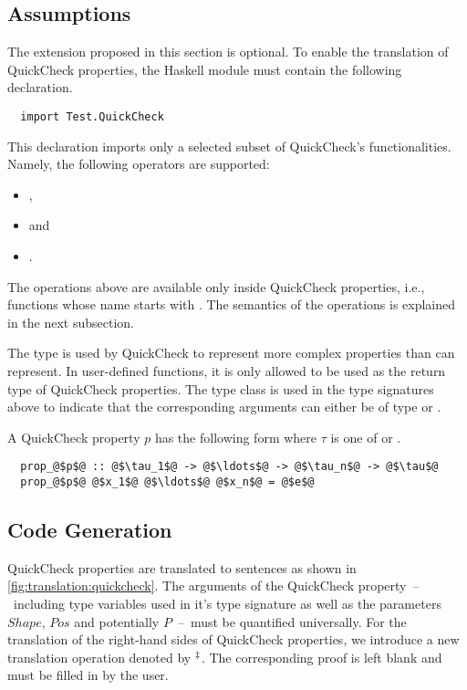 \subsection{Assumptions} \label{sec:translation:quickcheck:assumptions}
The extension proposed in this section is optional.
To enable the translation of QuickCheck properties, the Haskell module must contain the following  declaration.
\begin{verbatim}
  import Test.QuickCheck
\end{verbatim}
This  declaration imports only a selected subset of QuickCheck's functionalities.
Namely, the following operators are supported:
\begin{itemize}
  \item {},
  \item {} and
  \item {}.
\end{itemize}
The operations above are available only inside QuickCheck properties, i.e., functions whose name starts with .
The semantics of the operations is explained in the next subsection.

The type  is used by QuickCheck to represent more complex properties than  can represent.
In user-defined functions, it is only allowed to be used as the return type of QuickCheck properties.
The type class  is used in the type signatures above to indicate that the corresponding arguments can either be of type  or .

A QuickCheck property $p$ has the following form where $\tau$ is one of  or .
\begin{verbatim}
  prop_@$p$@ :: @$\tau_1$@ -> @$\ldots$@ -> @$\tau_n$@ -> @$\tau$@
  prop_@$p$@ @$x_1$@ @$\ldots$@ @$x_n$@ = @$e$@
\end{verbatim}

\subsection{Code Generation} \label{sec:translation:quickcheck:code-generation}
QuickCheck properties are translated to  sentences as shown in \autoref{fig:translation:quickcheck}.
The arguments of the QuickCheck property~--~including type variables used in it's type signature as well as the parameters $Shape$, $Pos$ and potentially $P$~--~must be quantified universally.
For the translation of the right-hand sides of QuickCheck properties, we introduce a new translation operation denoted by ${}^{\ddag}$.
The corresponding proof is left blank and must be filled in by the user.

